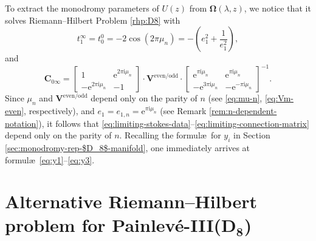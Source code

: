\documentclass[11pt]{article}
\numberwithin{equation}{section}
\numberwithin{equation}{section}
\newcommand{\ee}{\mathrm{e}}
\newcommand{\ii}{\mathrm{i}}
\begin{document}
To extract the monodromy parameters of $U(z)$ from $\mathbf{\Omega}(\lambda, z)$, we notice that it solves Riemann--Hilbert Problem \ref{rhp:D8} with
\begin{equation}\label{eq:limiting-stokes-data}
t_1^\infty = t_0^0 = -2\cos(2\pi \mu_n)= -\left(e_1^2+\frac{1}{e_1^2}\right),
\end{equation}
and
\begin{equation}
\mathbf{C}_{0\infty} = \begin{bmatrix} 1 & \ee^{2\pi \ii \mu_n} \\ -\ee^{2\pi \ii \mu_n} & -1 \end{bmatrix} \cdot \mathbf{V}^\mathrm{even/odd} \cdot \begin{bmatrix} \ee^{\pi \ii \mu_n}& \ee^{\pi \ii \mu_n}\\ - \ee^{3\pi \ii \mu_n} & - \ee^{-\pi \ii \mu_n} \end{bmatrix}^{-1}.
\label{eq:limiting-connection-matrix}
\end{equation}
Since $\mu_n$ and $\mathbf{V}^\mathrm{even/odd}$ depend only on the parity of $n$ (see \eqref{eq:mu-n}, \eqref{eq:Vm-even}, respectively), and ${e_1 = e_{1, n} = \ee^{\pi \ii \mu_n}}$ (see Remark \ref{rem:n-dependent-notation}), it follows that \eqref{eq:limiting-stokes-data}--\eqref{eq:limiting-connection-matrix} depend only on the parity of $n$. Recalling the formul\ae\ for $y_i$ in Section \ref{sec:monodromy-rep-$D_8$-manifold}, one immediately arrives at formul\ae\ \eqref{eq:y1}--\eqref{eq:y3}.


\setcounter{section}{8}
\section[Alternative Riemann-Hilbert problem for Painlev\'e-III(D\_8)]{Alternative Riemann--Hilbert problem for Painlev\'e-III($\boldsymbol{D_8}$)}
\end{document}
